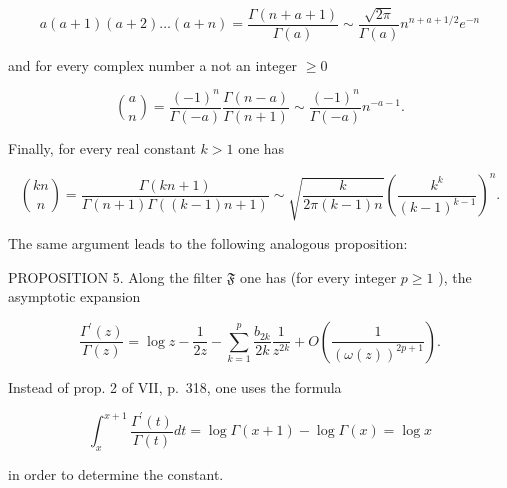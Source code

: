 \[
a (a + 1) (a + 2) \dots (a + n) = \frac {\Gamma (n + a + 1)}{\Gamma (a)} \sim \frac {\sqrt {2 \pi}}{\Gamma (a)} n ^ {n + a + 1 / 2} e ^ {- n}\tag{23}
\]

and for every complex number a not an integer \(\geqslant 0\)

\[
\binom {a} {n} = \frac {(- 1) ^ {n}}{\Gamma (- a)}   \frac {\Gamma (n - a)}{\Gamma (n + 1)} \sim \frac {(- 1) ^ {n}}{\Gamma (- a)}   n ^ {- a - 1}.\tag{24}
\]

Finally, for every real constant \(k > 1\) one has

\[
\binom {k n} {n} = \frac {\Gamma (k n + 1)}{\Gamma (n + 1)   \Gamma ((k - 1) n + 1)} \sim \sqrt {\frac {k}{2 \pi (k - 1) n}} \left(\frac {k ^ {k}}{(k - 1) ^ {k - 1}}\right) ^ {n}.\tag{25}
\]

The same argument leads to the following analogous proposition:

PROPOSITION 5. Along the filter \(\mathfrak{F}\) one has (for every integer \(p \geqslant 1\) ), the asymptotic expansion

\[
\frac {\Gamma^ {\prime} (z)}{\Gamma (z)} = \log z - \frac {1}{2 z} - \sum_ {k = 1} ^ {p} \frac {b _ {2 k}}{2 k} \frac {1}{z ^ {2 k}} + O \left(\frac {1}{(\omega (z)) ^ {2 p + 1}}\right).\tag{26}
\]

Instead of prop. 2 of VII, p.~318, one uses the formula

\[
\int_ {x} ^ {x + 1} \frac {\Gamma^ {\prime} (t)}{\Gamma (t)} d t = \log \Gamma (x + 1) - \log \Gamma (x) = \log x
\]

in order to determine the constant.

\setcounter{exercisegroup}{0}
